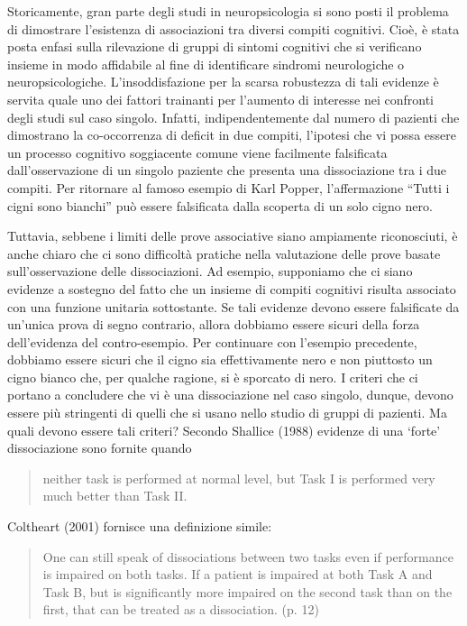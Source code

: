 Storicamente, gran parte degli studi in neuropsicologia si sono posti il problema di   dimostrare l'esistenza di associazioni tra diversi compiti cognitivi. 
Cioè, è stata posta enfasi sulla rilevazione di gruppi di sintomi cognitivi che si verificano insieme in modo affidabile al fine di identificare sindromi neurologiche o neuropsicologiche. 
L'insoddisfazione per la scarsa robustezza di tali evidenze è servita quale uno dei fattori trainanti per l'aumento di interesse nei confronti degli studi sul caso singolo. 
Infatti, indipendentemente dal numero di pazienti che dimostrano la co-occorrenza di deficit in due compiti, l'ipotesi che vi possa essere un processo cognitivo soggiacente comune viene facilmente falsificata dall'osservazione di un singolo paziente che presenta una dissociazione tra i due compiti. 
Per ritornare al famoso esempio di Karl Popper, l'affermazione ``Tutti i cigni sono bianchi'' può essere falsificata dalla scoperta di un solo cigno nero.

Tuttavia, sebbene i limiti delle prove associative siano ampiamente riconosciuti, è anche chiaro che ci sono difficoltà pratiche nella valutazione delle prove basate sull'osservazione delle dissociazioni. 
Ad esempio, supponiamo che ci siano evidenze a sostegno del fatto che un insieme di compiti cognitivi risulta associato con una funzione unitaria sottostante. 
Se tali evidenze devono essere falsificate da un'unica prova di segno contrario, allora dobbiamo essere sicuri della forza dell'evidenza del contro-esempio.
Per continuare con l'esempio precedente, dobbiamo essere sicuri che il cigno sia effettivamente nero e non piuttosto un cigno bianco che, per qualche ragione, si è sporcato di nero.
I criteri che ci portano a concludere che vi è una dissociazione nel caso singolo, dunque, devono essere più stringenti di quelli che si usano nello studio di gruppi di pazienti. 
Ma quali devono essere tali criteri?
Secondo Shallice (1988) evidenze di una `forte' dissociazione sono fornite quando 
\begin{quote}
neither task is performed at normal level, but Task I is performed very much better than Task II.
\end{quote}
Coltheart (2001) fornisce una definizione simile:
\begin{quote}
One can still speak of dissociations between two tasks even if performance is impaired on both tasks. 
If a patient is impaired at both Task A and Task B, but is significantly more impaired on the second task than on the first, that can be treated as a dissociation. (p. 12)
\end{quote}

